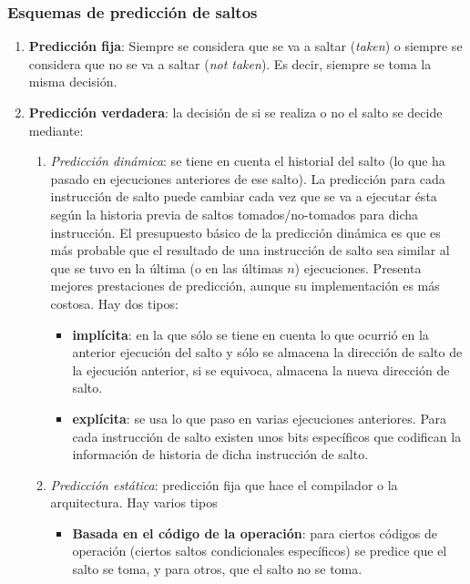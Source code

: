 \documentclass[10pt,a4paper,spanish]{report}
\begin{document}
\textcolor{azul}{\subsubsection{Esquemas de predicción de saltos}}
\begin{enumerate}[\color{azul}{$\heartsuit$}]
    \item \textbf{\textcolor{azul}{Predicción fija}}: Siempre se considera que se va a saltar (\textit{\textcolor{azul}{taken}}) o siempre se considera que no se va a saltar (\textit{\textcolor{azul}{not taken}}). Es decir, siempre se toma la misma decisión.

    \item \textbf{\textcolor{azul}{Predicción verdadera}}: la decisión de si se realiza o no el salto se decide mediante:
    \begin{enumerate}[$\longrightarrow$]
        \item \textit{\textcolor{azul}{Predicción dinámica}}: se tiene en cuenta el historial del salto (lo que ha pasado en ejecuciones anteriores de ese salto). La predicción para cada instrucción de salto puede cambiar cada vez que se va a ejecutar ésta según la historia previa de saltos tomados/no-tomados para dicha instrucción. El presupuesto básico de la predicción dinámica es que es más probable que el resultado de una instrucción de salto sea similar al que se tuvo en la última (o en las últimas $n$) ejecuciones. Presenta mejores prestaciones de predicción, aunque su implementación es más costosa. Hay dos tipos:
        \begin{itemize}
            \item \textbf{\textcolor{azul}{implícita}}: en la que sólo se tiene en cuenta lo que ocurrió en la anterior ejecución del salto y sólo se almacena la dirección de salto de la ejecución anterior, si se equivoca, almacena la nueva dirección de salto.

            \item \textbf{\textcolor{azul}{explícita}}: se usa lo que paso en varias ejecuciones anteriores. Para cada instrucción de salto existen unos bits específicos que codifican la información de historia de dicha instrucción de salto.
        \end{itemize}  

        \item \textit{\textcolor{azul}{Predicción estática}}: predicción fija que hace el compilador o la arquitectura. Hay varios tipos
        \begin{itemize}
            \item \textbf{\textcolor{azul}{Basada en el código de la operación}}: para ciertos códigos de operación (ciertos saltos condicionales específicos) se predice que el salto se toma, y para otros, que el salto no se toma.


\end{itemize}
\end{enumerate}
\end{enumerate}
\end{document}
